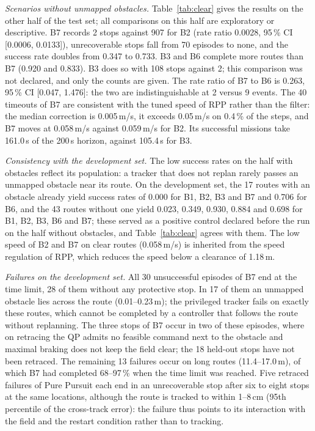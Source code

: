 \documentclass[conference]{IEEEtran}
\begin{document}
\emph{Scenarios without unmapped obstacles.} Table~\ref{tab:clear} gives the results on the other half of the
test set; all comparisons on this half are exploratory or descriptive. B7 records 2 stops against 907 for B2
(rate ratio 0.0028, 95\,\% CI [0.0006, 0.0133]), unrecoverable stops fall from 70 episodes to none, and the
success rate doubles from 0.347 to 0.733. B3 and
B6 complete more routes than B7 (0.920 and 0.833). B3 does so with 108 stops against 2; this comparison was not
declared, and only the counts are given. The rate ratio of B7 to B6 is 0.263, 95\,\% CI [0.047, 1.476]: the two are
indistinguishable at 2 versus 9 events. The 40 timeouts of B7 are consistent with the tuned speed of RPP rather than the filter: the median correction is 0.005\,m/s, it exceeds 0.05\,m/s on 0.4\,\% of the steps, and B7 moves at
0.058\,m/s against 0.059\,m/s for B2. Its successful missions take 161.0\,s of the 200\,s horizon, against 105.4\,s for B3.

\emph{Consistency with the development set.} The low success rates on the half with obstacles reflect its
population: a tracker that does not replan rarely passes an unmapped obstacle near its route. On the development
set, the 17 routes with an obstacle already yield success rates of 0.000 for B1, B2, B3 and B7 and 0.706 for B6,
and the 43 routes without one yield 0.023, 0.349, 0.930, 0.884 and 0.698 for B1, B2, B3, B6 and B7; these served
as a positive control declared before the run on the half without obstacles, and Table~\ref{tab:clear} agrees
with them. The low speed of B2 and B7 on clear
routes (0.058\,m/s) is inherited from the speed regulation of RPP, which reduces the speed below a clearance of 1.18\,m.

\emph{Failures on the development set.} All 30 unsuccessful episodes of B7 end at the time limit, 28 of them
without any protective stop. In 17 of them an unmapped obstacle lies across the route (0.01--0.23\,m); the
privileged tracker fails on exactly these routes, which cannot be completed by a controller that follows the
route without replanning. The three stops of B7 occur in two of these episodes, where on retracing the QP admits
no feasible command next to the obstacle and maximal braking does not keep the field clear; the 18 held-out stops
have not been retraced. The remaining 13 failures occur on long routes (11.4--17.0\,m), of which B7 had
completed 68--97\,\% when the time limit was reached. Five retraced failures of Pure Pursuit each end in an
unrecoverable stop after six to eight stops at the same locations, although the route is tracked to within
1--8\,cm (95th percentile of the cross-track error): the failure thus points to its interaction with the field and the
restart condition rather than to tracking.
\end{document}
